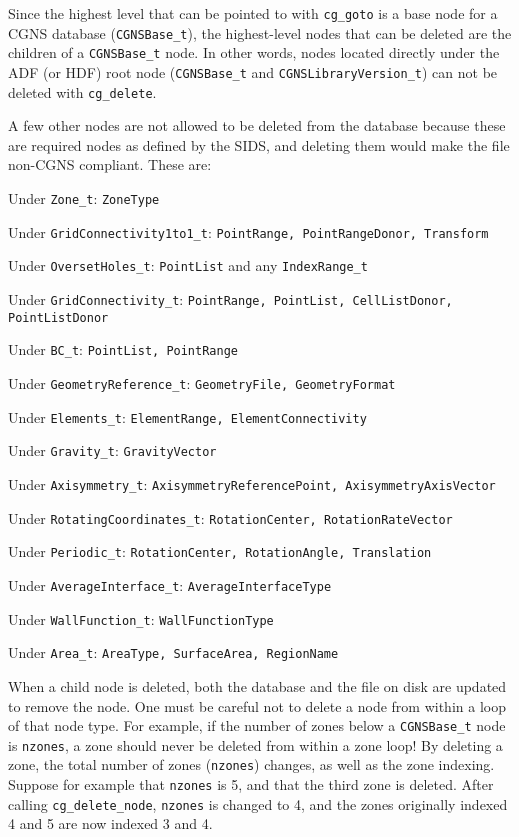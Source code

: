 Since the highest level that can be pointed to with \texttt{cg\_goto} is
a base node for a CGNS database
(\texttt{CGNSBase\_t}), the
highest-level nodes that can be deleted are the children of a
\texttt{CGNSBase\_t} node.
In other words, nodes located directly under the ADF (or HDF) root node
(\texttt{CGNSBase\_t} and
\texttt{CGNSLibraryVersion\_t})
can not be deleted with \texttt{cg\_delete}.

A few other nodes are not allowed to be deleted from the database
because these are required nodes as defined by the SIDS, and deleting
them would make the file non-CGNS compliant.
These are:
\begin{itemize*}
\item Under \texttt{Zone\_t}:
      \texttt{ZoneType} 
\item Under \texttt{GridConnectivity1to1\_t}:
      \texttt{PointRange, PointRangeDonor, Transform}
\item Under \texttt{OversetHoles\_t}:
      \texttt{PointList} and any \texttt{IndexRange\_t}
\item Under \texttt{GridConnectivity\_t}:
      \texttt{PointRange, PointList, CellListDonor, PointListDonor}
\item Under \texttt{BC\_t}:
      \texttt{PointList, PointRange}
\item Under \texttt{GeometryReference\_t}:
      \texttt{GeometryFile, GeometryFormat}
\item Under \texttt{Elements\_t}:
      \texttt{ElementRange, ElementConnectivity}
\item Under \texttt{Gravity\_t}:
      \texttt{GravityVector}
\item Under \texttt{Axisymmetry\_t}:
      \texttt{AxisymmetryReferencePoint, AxisymmetryAxisVector}
\item Under \texttt{RotatingCoordinates\_t}:
      \texttt{RotationCenter, RotationRateVector}
\item Under \texttt{Periodic\_t}:
      \texttt{RotationCenter, RotationAngle, Translation}
\item Under \texttt{AverageInterface\_t}:
      \texttt{AverageInterfaceType}
\item Under \texttt{WallFunction\_t}:
      \texttt{WallFunctionType}
\item Under \texttt{Area\_t}:
      \texttt{AreaType, SurfaceArea, RegionName}
\end{itemize*}

When a child node is deleted, both the database and the file on disk are
updated to remove the node.
One must be careful not to delete a node from within a loop of that node
type.
For example, if the number of zones below a \texttt{CGNSBase\_t} node is
\texttt{nzones}, a zone should never be deleted from within a zone loop!
By deleting a zone, the total number of zones (\texttt{nzones}) changes,
as well as the zone indexing.
Suppose for example that \texttt{nzones} is 5, and that the third zone
is deleted.
After calling \texttt{cg\_delete\_node}, \texttt{nzones} is changed to 4,
and the zones originally indexed 4 and 5 are now indexed 3 and 4.
